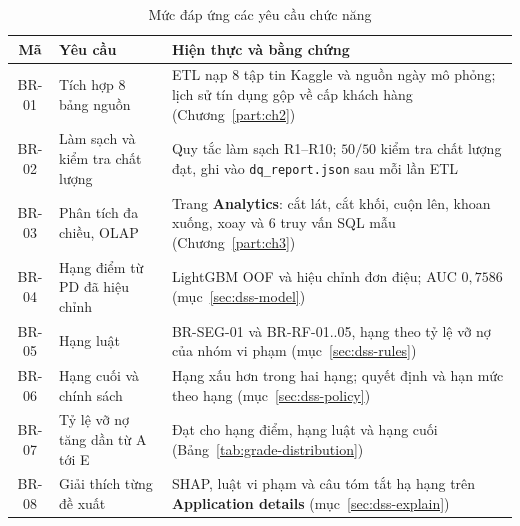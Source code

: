 \begin{table}[H]
	\centering
	\caption{Mức đáp ứng các yêu cầu chức năng}
	\label{tab:br-coverage}
	\footnotesize
	\begin{tabular}{c p{} p{}}
		\toprule
		\textbf{Mã} & \textbf{Yêu cầu}                & \textbf{Hiện thực và bằng chứng}                                                                                                                                        \\
		\midrule
		BR-01       & Tích hợp $8$ bảng nguồn         & ETL nạp $8$ tập tin Kaggle và nguồn ngày mô phỏng; lịch sử tín dụng gộp về cấp khách hàng (Chương~\ref{part:ch2})                                                       \\
		BR-02       & Làm sạch và kiểm tra chất lượng & Quy tắc làm sạch R1--R10; $50/50$ kiểm tra chất lượng đạt, ghi vào \texttt{dq\_report.json} sau mỗi lần ETL                                                             \\
		BR-03       & Phân tích đa chiều, OLAP        & Trang \textbf{Analytics}: cắt lát, cắt khối, cuộn lên, khoan xuống, xoay và $6$ truy vấn SQL mẫu (Chương~\ref{part:ch3})                                                \\
		BR-04       & Hạng điểm từ PD đã hiệu chỉnh   & LightGBM OOF và hiệu chỉnh đơn điệu; AUC $0{,}7586$ (mục~\ref{sec:dss-model})                                                                                           \\
		BR-05       & Hạng luật                       & BR-SEG-01 và BR-RF-01..05, hạng theo tỷ lệ vỡ nợ của nhóm vi phạm (mục~\ref{sec:dss-rules})                                                                             \\
		BR-06       & Hạng cuối và chính sách         & Hạng xấu hơn trong hai hạng; quyết định và hạn mức theo hạng (mục~\ref{sec:dss-policy})                                                                                 \\
		BR-07       & Tỷ lệ vỡ nợ tăng dần từ A tới E & Đạt cho hạng điểm, hạng luật và hạng cuối (Bảng~\ref{tab:grade-distribution})                                                                                           \\
		BR-08       & Giải thích từng đề xuất         & SHAP, luật vi phạm và câu tóm tắt hạ hạng trên \textbf{Application details} (mục~\ref{sec:dss-explain})                                                                 \\

\end{tabular}
\end{table}
